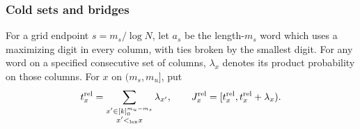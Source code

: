 \subsubsection{Cold sets and bridges}

For a grid endpoint $s=m_s/\log N$, let $a_s$ be the length-$m_s$ word
which uses a maximizing digit in every column, with ties broken by the
smallest digit. For any word on a specified consecutive set of columns,
$\lambda_x$ denotes its product probability on those columns.
For $x$ on $(m_s,m_u]$, put
\[
 t_x^{\rm rel}=\sum_{\substack{x'\in[k]_0^{m_u-m_s}\\x'<_{\rm lex}x}}
                \lambda_{x'},\qquad
 J_x^{\rm rel}=[t_x^{\rm rel},t_x^{\rm rel}+\lambda_x).
\]

